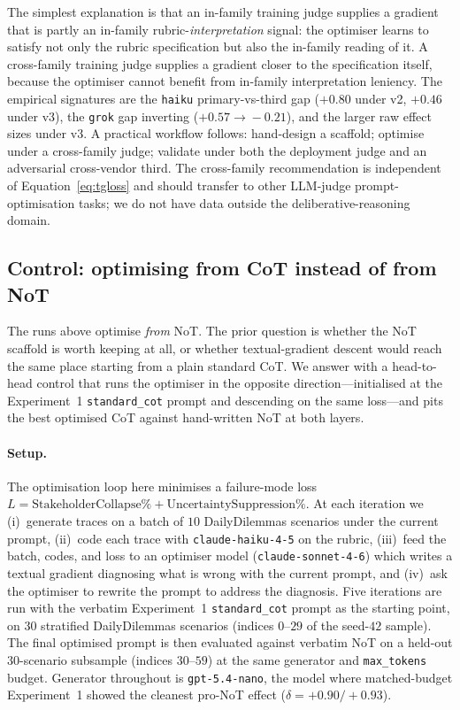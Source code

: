 \documentclass[11pt]{article}
\begin{document}
The simplest explanation is that an in-family training judge supplies a
gradient that is partly an in-family rubric-\emph{interpretation}
signal: the optimiser learns to satisfy not only the rubric
specification but also the in-family reading of it. A cross-family
training judge supplies a gradient closer to the specification itself,
because the optimiser cannot benefit from in-family interpretation
leniency. The empirical signatures are the \texttt{haiku}
primary-vs-third gap ($+0.80$ under v2, $+0.46$ under v3), the
\texttt{grok} gap inverting ($+0.57\!\to\!-0.21$), and the larger raw
effect sizes under v3. A practical workflow follows: hand-design a
scaffold; optimise under a cross-family judge; validate under both the
deployment judge and an adversarial cross-vendor third. The cross-family
recommendation is independent of Equation~\ref{eq:tgloss} and should
transfer to other LLM-judge prompt-optimisation tasks; we do not have
data outside the deliberative-reasoning domain.

\subsection{Control: optimising from CoT instead of from NoT}
\label{app:tg-cot-control}

The runs above optimise \emph{from} NoT. The prior question is whether
the NoT scaffold is worth keeping at all, or whether textual-gradient
descent would reach the same place starting from a plain standard CoT.
We answer with a head-to-head control that runs the optimiser in the
opposite direction---initialised at the Experiment~1
\texttt{standard\_cot} prompt and descending on the same loss---and
pits the best optimised CoT against hand-written NoT at both layers.

\paragraph{Setup.} The optimisation loop here minimises a failure-mode
loss $L = \text{StakeholderCollapse\%} + \text{UncertaintySuppression\%}$.
At each iteration we
(i)~generate traces on a batch of $10$ DailyDilemmas scenarios
under the current prompt, (ii)~code each trace with
\texttt{claude-haiku-4-5} on the rubric, (iii)~feed the batch,
codes, and loss to an optimiser model (\texttt{claude-sonnet-4-6})
which writes a textual gradient diagnosing what is wrong with the
current prompt, and (iv)~ask the optimiser to rewrite the prompt
to address the diagnosis. Five iterations are run with the
verbatim Experiment~1 \texttt{standard\_cot} prompt as the
starting point, on $30$ stratified DailyDilemmas scenarios
(indices $0$--$29$ of the seed-$42$ sample). The final optimised
prompt is then evaluated against verbatim NoT on a held-out
$30$-scenario subsample (indices $30$--$59$) at the same generator
and \texttt{max\_tokens} budget. Generator throughout is
\texttt{gpt-5.4-nano}, the model where matched-budget Experiment~1
showed the cleanest pro-NoT effect ($\delta = +0.90/+0.93$).
\end{document}
